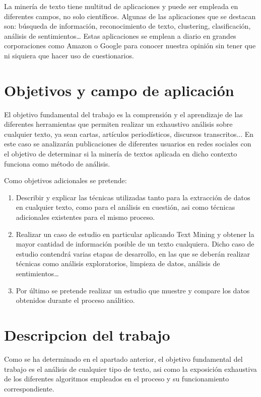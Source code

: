 La minería de texto tiene multitud de aplicaciones y puede ser empleada en diferentes 
campos, no solo científicos. Algunas de las aplicaciones que se destacan son: búsqueda de 
información, reconocimiento de texto, clustering, clasificación, análisis de sentimientos… Estas 
aplicaciones se emplean a diario en grandes corporaciones como Amazon o Google para conocer nuestra 
opinión sin tener que ni siquiera que hacer uso de cuestionarios.


\section{Objetivos y campo de aplicación}
\label{sec:objetivos-y-campo}

El objetivo fundamental del trabajo es la comprensión y el aprendizaje de las diferentes
herramientas que permiten realizar un exhaustivo análisis sobre cualquier texto, ya sean cartas, 
artículos periodísticos, discursos transcritos... En este caso se analizarán publicaciones de diferentes 
usuarios en redes sociales con el objetivo de determinar si la minería de textos aplicada en dicho contexto 
funciona como método de análisis.

Como objetivos adicionales se pretende:
\begin{enumerate}

\item Describir y explicar las técnicas utilizadas tanto para la extracción de datos en cualquier texto, 
como para el análisis en cuestión, asi como técnicas adicionales existentes para el mismo proceso.

\item Realizar un caso de estudio en particular aplicando Text Mining y  obtener la mayor cantidad 
de información posible de un texto cualquiera. Dicho caso de estudio contendrá varias etapas 
de desarrollo, en las que se deberán realizar técnicas como análisis exploratorios, limpieza de datos,
análisis de sentimientos…

\item Por último se pretende realizar un estudio que muestre y compare los datos obtenidos durante 
el proceso análitico. 

\end{enumerate}


\section{Descripcion del trabajo}
\label{sec:descripcion}
Como se ha determinado en el apartado anterior, el objetivo fundamental del trabajo es el análisis de 
cualquier tipo de texto, asi como la exposición exhaustiva de los diferentes algoritmos empleados en 
el proceso y su funcionamiento correspondiente. 

